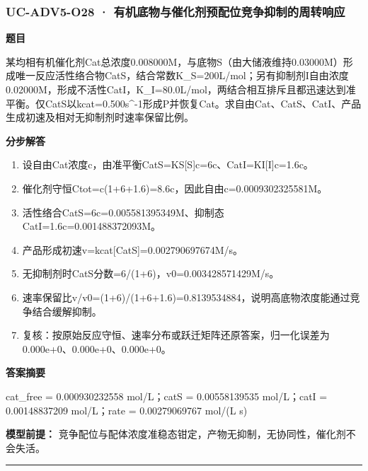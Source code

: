 \documentclass[UTF8,11pt,a4paper]{ctexart}
\begin{document}
\subsubsection*{UC-ADV5-O28 · 有机底物与催化剂预配位竞争抑制的周转响应}
\noindent\textbf{题目}\par
某均相有机催化剂Cat总浓度0.008000M，与底物S（由大储液维持0.03000M）形成唯一反应活性络合物CatS，结合常数K\_S=200L/mol；另有抑制剂I自由浓度0.02000M，形成不活性CatI，K\_I=80.0L/mol，两结合相互排斥且都迅速达到准平衡。仅CatS以kcat=0.500s\textasciicircum{}-1形成P并恢复Cat。求自由Cat、CatS、CatI、产品生成初速及相对无抑制剂时速率保留比例。\par
\medskip\noindent\textbf{分步解答}
\begin{enumerate}
\item 设自由Cat浓度c，由准平衡CatS=KS[S]c=6c、CatI=KI[I]c=1.6c。
\item 催化剂守恒Ctot=c(1+6+1.6)=8.6c，因此自由c=0.0009302325581M。
\item 活性络合CatS=6c=0.005581395349M、抑制态CatI=1.6c=0.001488372093M。
\item 产品形成初速v=kcat[CatS]=0.002790697674M/s。
\item 无抑制剂时CatS分数=6/(1+6)，v0=0.003428571429M/s。
\item 速率保留比v/v0=(1+6)/(1+6+1.6)=0.8139534884，说明高底物浓度能通过竞争结合缓解抑制。
\item 复核：按原始反应守恒、速率分布或跃迁矩阵还原答案，归一化误差为0.000e+0、0.000e+0、0.000e+0。
\end{enumerate}
\noindent\textbf{答案摘要}\par
cat\_free = 0.000930232558 mol/L；catS = 0.00558139535 mol/L；catI = 0.00148837209 mol/L；rate = 0.00279069767 mol/(L s)\par
\noindent\textbf{模型前提：}
竞争配位与配体浓度准稳态钳定，产物无抑制，无协同性，催化剂不会失活。\par
\medskip\hrule\medskip
{}
\end{document}
